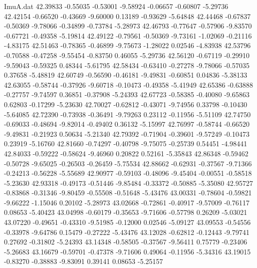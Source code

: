 \begin{filecontents}{ImuA.dat}
  42.39833   -0.55035   -0.53001   -9.58924   -0.06657   -0.60807   -5.29736
  42.42154   -0.66520   -0.43669   -9.60000    0.13189   -0.93629   -5.64848
  42.44468   -0.67837   -0.50369   -9.78066   -0.34899   -0.73784   -5.28973
  42.46793   -0.77647   -0.57906   -9.83570   -0.67721   -0.49358   -5.19814
  42.49122   -0.79561   -0.50369   -9.73161   -1.02069   -0.21116   -4.83175
  42.51463   -0.78365   -0.46899   -9.75673   -1.28022    0.02546   -4.83938
  42.53796   -0.70588   -0.47258   -9.55454   -0.83750    0.46055   -5.29736
  42.56120   -0.67119   -0.29910   -9.59043   -0.59325    0.48344   -5.61795
  42.58434   -0.63410   -0.27278   -9.78066   -0.57035    0.37658   -5.48819
  42.60749   -0.56590   -0.46181   -9.49831   -0.60851    0.04836   -5.38133
  42.63055   -0.58744   -0.37926   -9.60718   -0.10473   -0.49358   -5.41949
  42.65386   -0.63888   -0.27757   -9.74597    0.36851   -0.37908   -5.24393
  42.67723   -0.58385   -0.40080   -9.65863    0.62803   -0.17299   -5.23630
  42.70027   -0.62812   -0.43071   -9.74956    0.33798   -0.10430   -5.64085
  42.72390   -0.73938   -0.36491   -9.79263    0.23112   -0.11956   -5.51109
  42.74750   -0.69033   -0.48694   -9.82014   -0.49402    0.36132   -5.15997
  42.76997   -0.58744   -0.66520   -9.49831   -0.21923    0.50634   -5.21340
  42.79392   -0.71904   -0.39601   -9.57249   -0.10473    0.23919   -5.16760
  42.81660   -0.74297   -0.40798   -9.75075   -0.25739    0.54451   -4.98441
  42.84033   -0.59222   -0.58624   -9.46960    0.20822    0.52161   -5.35843
  42.86348   -0.59462   -0.50728   -9.65025   -0.26503   -0.26459   -5.75534
  42.88662   -0.62931   -0.37567   -9.71366   -0.24213   -0.56228   -5.55689
  42.90977   -0.59103   -0.48096   -9.45404   -0.00551   -0.58518   -5.23630
  42.93318   -0.49173   -0.51446   -9.85484   -0.33372   -0.50885   -5.35080
  42.95727   -0.83868   -0.31346   -9.80459   -0.55508   -0.51648   -5.43476
  43.00331   -0.78604   -0.59821   -9.66222   -1.15046    0.20102   -5.28973
  43.02668   -0.72861   -0.40917   -9.57009   -0.76117    0.08653   -5.40423
  43.04998   -0.60179   -0.35653   -9.71606   -0.57798    0.26209   -5.03021
  43.07220   -0.49651   -0.43310   -9.51985   -0.12000    0.02546   -5.09127
  43.09553   -0.54556   -0.33978   -9.64786    0.15479   -0.27222   -5.43476
  43.12028   -0.62812   -0.12443   -9.79741    0.27692   -0.31802   -5.24393
  43.14348   -0.58505   -0.37567   -9.56411    0.75779   -0.23406   -5.26683
  43.16679   -0.59701   -0.47378   -9.71606    0.49064   -0.11956   -5.34316
  43.19015   -0.83270   -0.38883   -9.83091    0.39141    0.08653   -5.25157

\end{filecontents}

